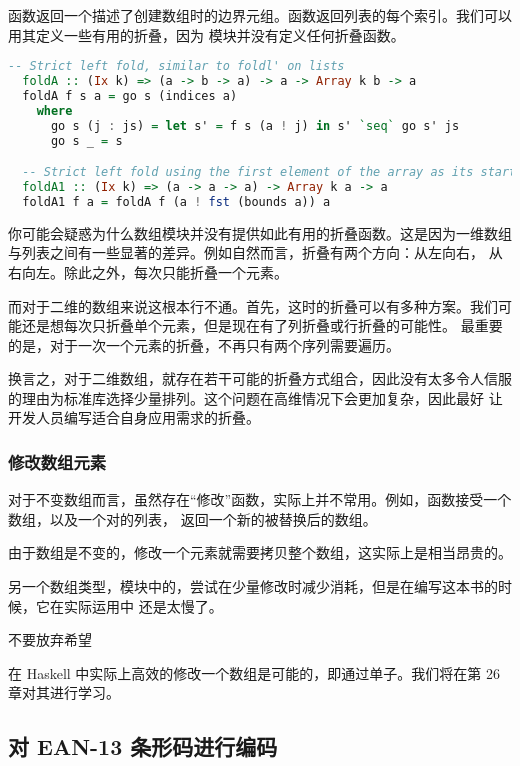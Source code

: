 \documentclass[./main.tex]{subfiles}
\begin{document}
函数返回一个描述了创建数组时的边界元组。函数返回列表的每个索引。我们可以用其定义一些有用的折叠，因为
模块并没有定义任何折叠函数。

\begin{lstlisting}[language=Haskell]
  -- Strict left fold, similar to foldl' on lists
  foldA :: (Ix k) => (a -> b -> a) -> a -> Array k b -> a
  foldA f s a = go s (indices a)
    where
      go s (j : js) = let s' = f s (a ! j) in s' `seq` go s' js
      go s _ = s

  -- Strict left fold using the first element of the array as its starting value, similar to fold1 on lists
  foldA1 :: (Ix k) => (a -> a -> a) -> Array k a -> a
  foldA1 f a = foldA f (a ! fst (bounds a)) a
\end{lstlisting}

你可能会疑惑为什么数组模块并没有提供如此有用的折叠函数。这是因为一维数组与列表之间有一些显著的差异。例如自然而言，折叠有两个方向：从左向右，
从右向左。除此之外，每次只能折叠一个元素。

而对于二维的数组来说这根本行不通。首先，这时的折叠可以有多种方案。我们可能还是想每次只折叠单个元素，但是现在有了列折叠或行折叠的可能性。
最重要的是，对于一次一个元素的折叠，不再只有两个序列需要遍历。

换言之，对于二维数组，就存在若干可能的折叠方式组合，因此没有太多令人信服的理由为标准库选择少量排列。这个问题在高维情况下会更加复杂，因此最好
让开发人员编写适合自身应用需求的折叠。

\subsubsection*{修改数组元素}

对于不变数组而言，虽然存在“修改”函数，实际上并不常用。例如，函数接受一个数组，以及一个对的列表，
返回一个新的被替换后的数组。

由于数组是不变的，修改一个元素就需要拷贝整个数组，这实际上是相当昂贵的。

另一个数组类型，模块中的，尝试在少量修改时减少消耗，但是在编写这本书的时候，它在实际运用中
还是太慢了。

\begin{anote}
  不要放弃希望

  在 Haskell 中实际上高效的修改一个数组是可能的，即通过单子。我们将在第 26 章对其进行学习。
\end{anote}

\subsection*{对 EAN-13 条形码进行编码}
\end{document}
